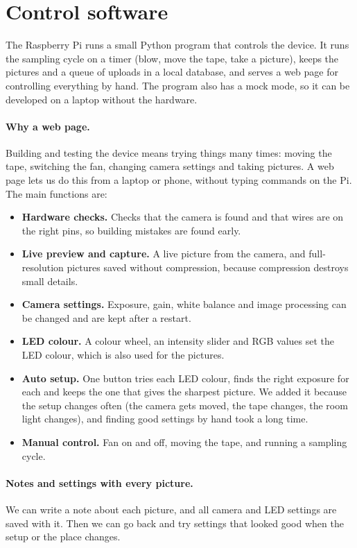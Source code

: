 \section{Control software}\label{sec:control-software}

The Raspberry Pi runs a small Python program that controls the device. It runs the sampling
cycle on a timer (blow, move the tape, take a picture), keeps the pictures and a queue of
uploads in a local database, and serves a web page for controlling everything by hand.
The program also has a mock mode, so it can be developed on a laptop without the hardware.

\paragraph{Why a web page.}
Building and testing the device means trying things many times: moving the tape, switching
the fan, changing camera settings and taking pictures. A web page lets us do this from a laptop
or phone, without typing commands on the Pi. The main functions are:

\begin{itemize}
  \item \textbf{Hardware checks.} Checks that the camera is found and that wires are on the right
  pins, so building mistakes are found early.
  \item \textbf{Live preview and capture.} A live picture from the camera, and full-resolution
  pictures saved without compression, because compression destroys small details.
  \item \textbf{Camera settings.} Exposure, gain, white balance and image processing can be changed
  and are kept after a restart.
  \item \textbf{LED colour.} A colour wheel, an intensity slider and RGB values set the LED colour,
  which is also used for the pictures.
  \item \textbf{Auto setup.} One button tries each LED colour, finds the right exposure for each
  and keeps the one that gives the sharpest picture. We added it
  because the setup changes often (the camera gets moved, the tape changes, the room light
  changes), and finding good settings by hand took a long time.
  \item \textbf{Manual control.} Fan on and off, moving the tape, and running a sampling cycle.
\end{itemize}

\paragraph{Notes and settings with every picture.}
We can write a note about each picture, and all camera and LED settings are saved with it.
Then we can go back and try settings that looked good when the setup or the place changes.

